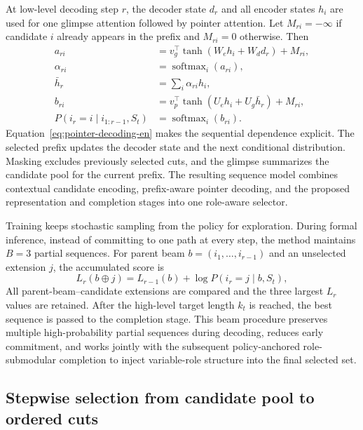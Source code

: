 \documentclass[journal]{IEEEtran}
\begin{document}
At low-level decoding step $r$, the decoder state $d_r$ and all encoder states $h_i$ are used for one glimpse attention followed by pointer attention. Let $M_{ri}=-\infty$ if candidate $i$ already appears in the prefix and $M_{ri}=0$ otherwise. Then
\begin{equation}
\begin{aligned}
a_{ri}&=v_g^\top\tanh(W_e h_i+W_d d_r)+M_{ri},\\
\alpha_{ri}&=\operatorname{softmax}_i(a_{ri}),\\
\bar h_r&=\sum_i\alpha_{ri}h_i,\\
b_{ri}&=v_p^\top\tanh(U_e h_i+U_g\bar h_r)+M_{ri},\\
P(i_r=i\mid i_{1:r-1},S_t)&=\operatorname{softmax}_i(b_{ri}).
\end{aligned}
\label{eq:pointer-decoding-en}
\end{equation}
Equation~\eqref{eq:pointer-decoding-en} makes the sequential dependence explicit. The selected prefix updates the decoder state and the next conditional distribution. Masking excludes previously selected cuts, and the glimpse summarizes the candidate pool for the current prefix. The resulting sequence model combines contextual candidate encoding, prefix-aware pointer decoding, and the proposed representation and completion stages into one role-aware selector.

Training keeps stochastic sampling from the policy for exploration. During formal inference, instead of committing to one path at every step, the method maintains $B=3$ partial sequences. For parent beam $b=(i_1,\ldots,i_{r-1})$ and an unselected extension $j$, the accumulated score is
\begin{equation}
L_r(b\oplus j)=L_{r-1}(b)+\log P(i_r=j\mid b,S_t),
\label{eq:beam-score-en}
\end{equation}
All parent-beam--candidate extensions are compared and the three largest $L_r$ values are retained. After the high-level target length $k_t$ is reached, the best sequence is passed to the completion stage. This beam procedure preserves multiple high-probability partial sequences during decoding, reduces early commitment, and works jointly with the subsequent policy-anchored role-submodular completion to inject variable-role structure into the final selected set.

\subsection{Stepwise selection from candidate pool to ordered cuts}
\end{document}
